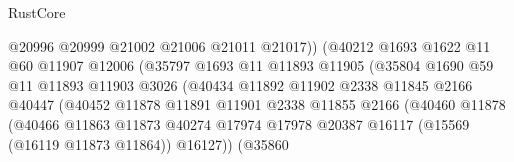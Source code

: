 \begin{lexlean}{RustCore}
\begin{coremodule}
                                        @20996
                                        @20999
                                        @21002
                                        @21006
                                        @21011
                                        @21017))
                                    (@40212
                                      @1693
                                      @1622
                                      @11
                                      @60
                                      @11907
                                      @12006
                                      (@35797
                                        @1693
                                        @11
                                        @11893
                                        @11905
                                        (@35804
                                          @1690
                                          @59
                                          @11
                                          @11893
                                          @11903
                                          @3026
                                          (@40434
                                            @11892
                                            @11902
                                            @2338
                                            @11845
                                            @2166
                                            @40447
                                            (@40452
                                              @11878
                                              @11891
                                              @11901
                                              @2338
                                              @11855
                                              @2166
                                              (@40460
                                                @11878
                                                (@40466
                                                  @11863
                                                  @11873
                                                  @40274
                                                  @17974
                                                  @17978
                                                  @20387
                                                  @16117
                                                  (@15569 (@16119 @11873 @11864))
                                                  @16127))
                                              (@35860

\end{coremodule}
\end{lexlean}
